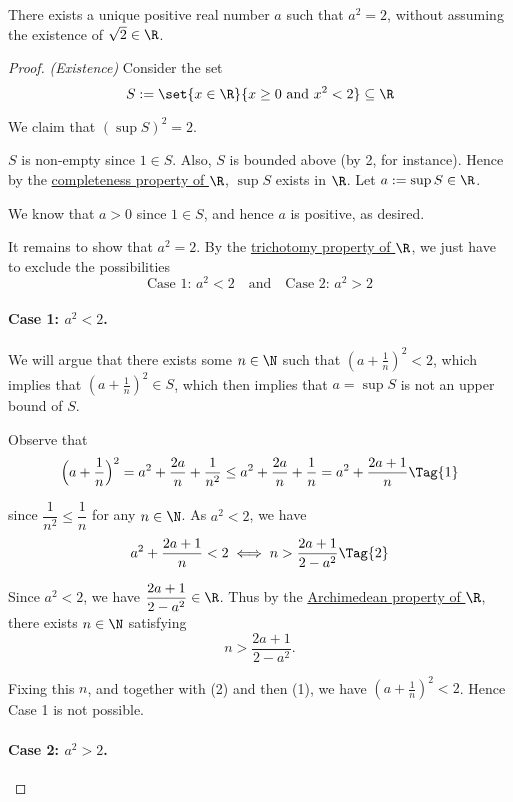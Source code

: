 \label{b88beb7}

There exists a unique positive real number $a$ such that $a^2=2$, without
assuming the existence of $\sqrt2\in\R$.

\begin{proof}
  \textit{(Existence)} Consider the set
  $$
    S:=\set{x\in\R}{x\geq0\text{ and }x^2<2}\subseteq\R
  $$

  We claim that $(\sup S)^2=2$.

  $S$ is non-empty since $1\in S$. Also, $S$ is bounded above (by 2, for
  instance). Hence by the \href{f330cf9}{completeness property of $\R$}, $\sup
  S$ exists in $\R$. Let $a:=\sup S\in\R$.

  We know that $a>0$ since $1\in S$, and hence $a$ is positive, as desired.

  It remains to show that $a^2=2$. By the \href{d49c63e}{trichotomy property of
  $\R$}, we just have to exclude the possibilities
  $$
    \text{Case 1: }a^2<2\quad\text{and}\quad\text{Case 2: }a^2>2
  $$

  \paragraph{Case 1: $a^2<2$.}

  We will argue that there exists some $n\in\N$ such that $(a+\frac1n)^2<2$,
  which implies that $(a+\frac1n)^2\in S$, which then implies that $a=\sup S$ is
  not an upper bound of $S$.

  Observe that
  \begin{equation*}
    \Big(a+\frac1n\Big)^2=a^2+\frac{2a}n+\frac1{n^2}\leq
    a^2+\frac{2a}n+\frac1n=a^2+\frac{2a+1}n\Tag{1}
  \end{equation*}

  since $\dfrac1{n^2}\leq\dfrac1n$ for any $n\in\N$. As $a^2<2$, we have
  \begin{equation*}
    a^2+\frac{2a+1}n<2\iff n>\frac{2a+1}{2-a^2}\Tag{2}
  \end{equation*}

  Since $a^2<2$, we have $\dfrac{2a+1}{2-a^2}\in\R$. Thus by the
  \href{fbc2289}{Archimedean property of $\R$}, there exists $n\in\N$ satisfying
  $$
    n>\frac{2a+1}{2-a^2}.
  $$

  Fixing this $n$, and together with (2) and then (1), we have
  $(a+\frac1{n})^2<2$. Hence Case 1 is not possible.

  \paragraph{Case 2: $a^2>2$.}


\end{proof}
